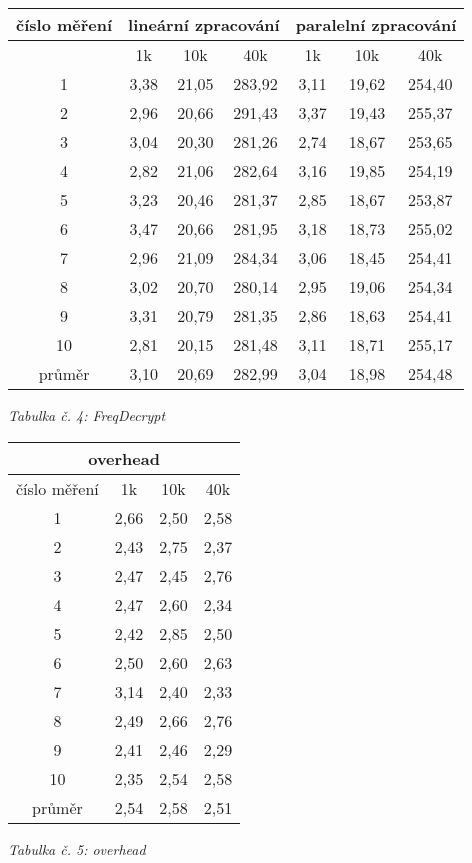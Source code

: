 \documentclass{article}
\begin{document}
\begin{center}
	\begin{tabular}{ c | c | c | c | c | c | c }
		\textbf{číslo měření} & \multicolumn{3}{c|}{\textbf{lineární zpracování}} & \multicolumn{3}{|c}{\textbf{paralelní zpracování}} \\
		\hline
		& 1k & 10k & 40k & 1k & 10k & 40k \\
		\hline
		\hline
		1 & 3,38 & 21,05 & 283,92 & 3,11 & 19,62 & 254,40 \\
		\hline
		2 & 2,96 & 20,66 & 291,43 & 3,37 & 19,43 & 255,37 \\
		\hline
		3 & 3,04 & 20,30 & 281,26 & 2,74 & 18,67 & 253,65 \\
		\hline
		4 & 2,82 & 21,06 & 282,64 & 3,16 & 19,85 & 254,19 \\
		\hline
		5 & 3,23 & 20,46 & 281,37 & 2,85 & 18,67 & 253,87 \\
		\hline
		6 & 3,47 & 20,66 & 281,95 & 3,18 & 18,73 & 255,02 \\
		\hline
		7 & 2,96 & 21,09 & 284,34 & 3,06 & 18,45 & 254,41 \\
		\hline
		8 & 3,02 & 20,70 & 280,14 & 2,95 & 19,06 & 254,34 \\
		\hline
		9 & 3,31 & 20,79 & 281,35 & 2,86 & 18,63 & 254,41 \\
		\hline
		10 & 2,81 & 20,15 & 281,48 & 3,11 & 18,71 & 255,17 \\
		\hline
		průměr & 3,10 & 20,69 & 282,99 & 3,04 & 18,98 & 254,48 \\
	\end{tabular}
	\newline
	\textit{Tabulka č. 4: FreqDecrypt}
\end{center}

\begin{center}
	\begin{tabular}{ c | c | c | c }
		\multicolumn{4}{c}{\textbf{overhead}} \\
		\hline
		číslo měření & 1k & 10k & 40k \\
		\hline
		\hline
		1 & 2,66 & 2,50 & 2,58 \\
		\hline
		2 & 2,43 & 2,75 & 2,37 \\
		\hline
		3 & 2,47 & 2,45 & 2,76 \\
		\hline
		4 & 2,47 & 2,60 & 2,34 \\
		\hline
		5 & 2,42 & 2,85 & 2,50 \\
		\hline
		6 & 2,50 & 2,60 & 2,63 \\
		\hline
		7 & 3,14 & 2,40 & 2,33 \\
		\hline
		8 & 2,49 & 2,66 & 2,76 \\
		\hline
		9 & 2,41 & 2,46 & 2,29 \\
		\hline
		10 & 2,35 & 2,54 & 2,58 \\
		\hline
		průměr & 2,54 & 2,58 & 2,51 \\
	\end{tabular}
	\newline
	\textit{Tabulka č. 5: overhead}
\end{center}
\end{document}
